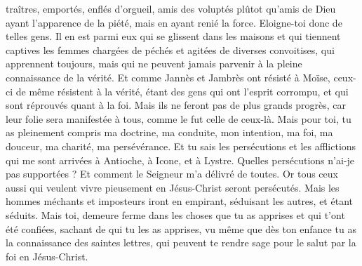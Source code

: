 \begin{multicols}{2}
traîtres, emportés, enflés d'orgueil, amis des voluptés plûtot qu'amis de Dieu
ayant l'apparence de la piété, mais en ayant renié la force. Eloigne-toi donc de telles gens.
Il en est parmi eux qui se glissent dans les maisons et qui tiennent captives les femmes chargées de péchés et agitées de diverses convoitises,
qui apprennent toujours, mais qui ne peuvent jamais parvenir à la pleine connaissance de la vérité.
Et comme Jannès et Jambrès ont résisté à Moïse, ceux-ci de même résistent à la vérité, étant des gens qui ont l'esprit corrompu, et qui sont réprouvés quant à la foi.
Mais ils ne feront pas de plus grands progrès, car leur folie sera manifestée à tous, comme le fut celle de ceux-là.
Mais pour toi, tu as pleinement compris ma doctrine, ma conduite, mon intention, ma foi, ma douceur, ma charité, ma persévérance.
Et tu sais les persécutions et les afflictions qui me sont arrivées à Antioche, à Icone, et à Lystre. Quelles persécutions n’ai-je pas supportées ? Et comment le Seigneur m'a délivré de toutes.
Or tous ceux aussi qui veulent vivre pieusement en Jésus-Christ seront persécutés.
Mais les hommes méchants et imposteurs iront en empirant, séduisant les autres, et étant séduits.
Mais toi, demeure ferme dans les choses que tu as apprises et qui t'ont été confiées, sachant de qui tu les as apprises,
vu même que dès ton enfance tu as la connaissance des saintes lettres, qui peuvent te rendre sage pour le salut par la foi en Jésus-Christ.

\end{multicols}
